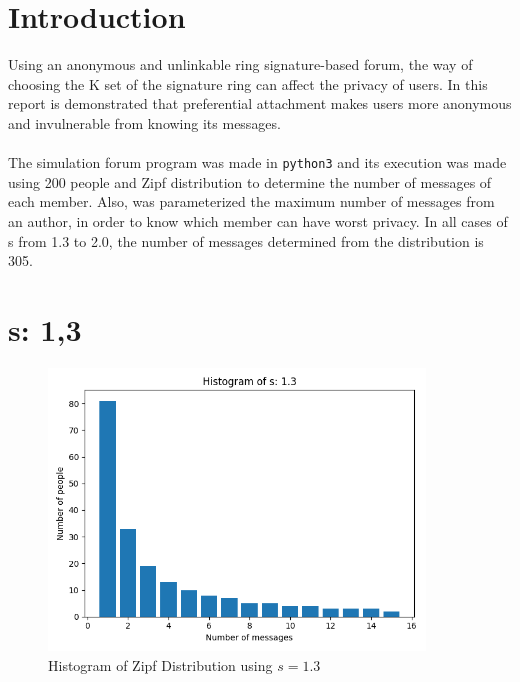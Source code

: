 \documentclass{article}
\begin{document}
\section{Introduction}
Using an anonymous and unlinkable ring signature-based forum, the way of choosing the K set of the signature ring can affect the privacy of users.
In this report is demonstrated that preferential attachment makes users more anonymous and invulnerable from knowing its messages.\\
\\
The simulation forum program was made in \texttt{python3} and its execution was made using 200 people and Zipf distribution to determine the number of messages of each member. Also, was parameterized the maximum number of messages from an author, in order to know which member can have worst privacy. In all cases of s from 1.3 to 2.0, the number of messages determined from the distribution is 305.  
\section{s: 1,3}
\begin{figure}[H] 
	\centering
	\includegraphics[width=10cm]{imgs/histogram-13.png}
	\caption{Histogram of Zipf Distribution using $s=1.3$}
	\label{fig:hist-13}
  \end{figure}


\end{document}
